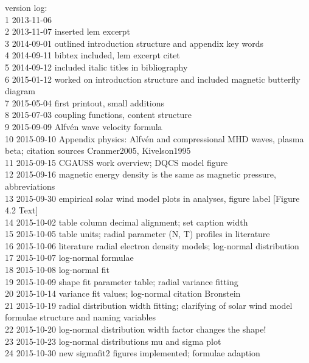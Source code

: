 \begin{footnotesize}
\noindent version log:\\
1	2013-11-06\\
2	2013-11-07	inserted lem excerpt\\
3	2014-09-01	outlined introduction structure and appendix key words\\
4	2014-09-11	bibtex included, lem excerpt citet\\
5	2014-09-12	included italic titles in bibliography\\
6	2015-01-12	worked on introduction structure and included magnetic butterfly diagram\\
7	2015-05-04	first printout, small additions\\
8	2015-07-03	coupling functions, content structure\\
9	2015-09-09	Alfv\'en wave velocity formula\\
10	2015-09-10	Appendix physics: Alfv\'en and compressional MHD waves, plasma beta; citation sources Cranmer2005, Kivelson1995\\
11	2015-09-15	CGAUSS work overview; DQCS model figure\\
12	2015-09-16	magnetic energy density is the same as magnetic pressure, abbreviations\\
13	2015-09-30	empirical solar wind model plots in analyses, figure label [Figure 4.2  Text]\\
14	2015-10-02	table column decimal alignment; set caption width\\
15	2015-10-05	table units; radial parameter (N, T) profiles in literature\\
16	2015-10-06	literature radial electron density models; log-normal distribution\\
17	2015-10-07	log-normal formulae\\
18	2015-10-08	log-normal fit\\
19	2015-10-09	shape fit parameter table; radial variance fitting\\
20	2015-10-14	variance fit values; log-normal citation Bronstein\\
21	2015-10-19	radial distribution width fitting; clarifying of solar wind model formulae structure and naming variables\\
22	2015-10-20	log-normal distribution width factor changes the shape!\\
23	2015-10-23	log-normal distributions mu and sigma plot\\
24	2015-10-30	new sigmafit2 figures implemented; formulae adaption\\

\end{footnotesize}
